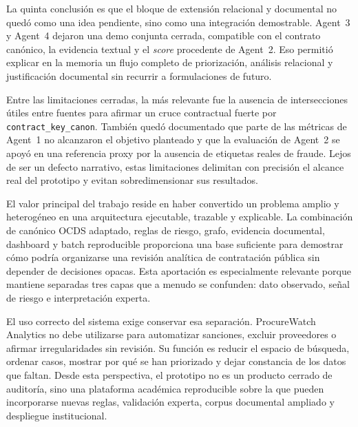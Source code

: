 \documentclass[11pt,a4paper,spanish]{book}
\numberwithin{equation}{chapter}
\numberwithin{figure}{chapter}
\begin{document}
La quinta conclusi{\'o}n es que el bloque de extensi{\'o}n relacional y documental no qued{\'o} como una
idea pendiente, sino como una integraci{\'o}n demostrable. Agent~3 y Agent~4 dejaron una demo
conjunta cerrada, compatible con el contrato can{\'o}nico, la evidencia textual y el \textit{score}
procedente de Agent~2. Eso permiti{\'o} explicar en la memoria un flujo completo de priorizaci{\'o}n,
an{\'a}lisis relacional y justificaci{\'o}n documental sin recurrir a formulaciones de futuro.

Entre las limitaciones cerradas, la m{\'a}s relevante fue la ausencia de intersecciones {\'u}tiles entre
fuentes para afirmar un cruce contractual fuerte por \texttt{contract\_key\_canon}. Tambi{\'e}n qued{\'o}
documentado que parte de las m{\'e}tricas de Agent~1 no alcanzaron el objetivo planteado y que la
evaluaci{\'o}n de Agent~2 se apoy{\'o} en una referencia proxy por la ausencia de etiquetas reales de
fraude. Lejos de ser un defecto narrativo, estas limitaciones delimitan con precisi{\'o}n el alcance
real del prototipo y evitan sobredimensionar sus resultados.

El valor principal del trabajo reside en haber convertido un problema amplio y heterog{\'e}neo en una
arquitectura ejecutable, trazable y explicable. La combinaci{\'o}n de can{\'o}nico OCDS adaptado,
reglas de riesgo, grafo, evidencia documental, dashboard y batch reproducible proporciona una base
suficiente para demostrar c{\'o}mo podr{\'i}a organizarse una revisi{\'o}n anal{\'i}tica de contrataci{\'o}n
p{\'u}blica sin depender de decisiones opacas. Esta aportaci{\'o}n es especialmente relevante porque
mantiene separadas tres capas que a menudo se confunden: dato observado, se{\~n}al de riesgo e
interpretaci{\'o}n experta.

El uso correcto del sistema exige conservar esa separaci{\'o}n. ProcureWatch Analytics no debe
utilizarse para automatizar sanciones, excluir proveedores o afirmar irregularidades sin revisi{\'o}n.
Su funci{\'o}n es reducir el espacio de b{\'u}squeda, ordenar casos, mostrar por qu{\'e} se han
priorizado y dejar constancia de los datos que faltan. Desde esta perspectiva, el prototipo no es un
producto cerrado de auditor{\'i}a, sino una plataforma acad{\'e}mica reproducible sobre la que pueden
incorporarse nuevas reglas, validaci{\'o}n experta, corpus documental ampliado y despliegue
institucional.
\end{document}
